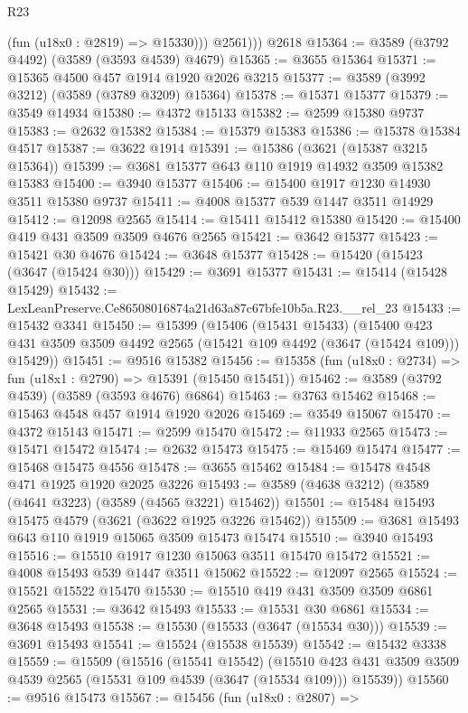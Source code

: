 \begin{lexlean}{R23}
\begin{coremodule}
            (fun (u18x0 : @2819) => @15330)))
          @2561)))
    @2618
@15364 := @3589 (@3792 @4492) (@3589 (@3593 @4539) @4679)
@15365 := @3655 @15364
@15371 := @15365 @4500 @457 @1914 @1920 @2026 @3215
@15377 := @3589 (@3992 @3212) (@3589 (@3789 @3209) @15364)
@15378 := @15371 @15377
@15379 := @3549 @14934
@15380 := @4372 @15133
@15382 := @2599 @15380 @9737
@15383 := @2632 @15382
@15384 := @15379 @15383
@15386 := @15378 @15384 @4517
@15387 := @3622 @1914
@15391 := @15386 (@3621 (@15387 @3215 @15364))
@15399 := @3681 @15377 @643 @110 @1919 @14932 @3509 @15382 @15383
@15400 := @3940 @15377
@15406 := @15400 @1917 @1230 @14930 @3511 @15380 @9737
@15411 := @4008 @15377 @539 @1447 @3511 @14929
@15412 := @12098 @2565
@15414 := @15411 @15412 @15380
@15420 := @15400 @419 @431 @3509 @3509 @4676 @2565
@15421 := @3642 @15377
@15423 := @15421 @30 @4676
@15424 := @3648 @15377
@15428 := @15420 (@15423 (@3647 (@15424 @30)))
@15429 := @3691 @15377
@15431 := @15414 (@15428 @15429)
@15432 := LexLeanPreserve.Ce86508016874a21d63a87c67bfe10b5a.R23.__rel_23
@15433 := @15432 @3341
@15450 := @15399
    (@15406
      (@15431 @15433)
      (@15400 @423 @431 @3509 @3509 @4492 @2565 (@15421 @109 @4492 (@3647 (@15424 @109))) @15429))
@15451 := @9516 @15382
@15456 := @15358 (fun (u18x0 : @2734) => fun (u18x1 : @2790) => @15391 (@15450 @15451))
@15462 := @3589 (@3792 @4539) (@3589 (@3593 @4676) @6864)
@15463 := @3763 @15462
@15468 := @15463 @4548 @457 @1914 @1920 @2026
@15469 := @3549 @15067
@15470 := @4372 @15143
@15471 := @2599 @15470
@15472 := @11933 @2565
@15473 := @15471 @15472
@15474 := @2632 @15473
@15475 := @15469 @15474
@15477 := @15468 @15475 @4556
@15478 := @3655 @15462
@15484 := @15478 @4548 @471 @1925 @1920 @2025 @3226
@15493 := @3589 (@4638 @3212) (@3589 (@4641 @3223) (@3589 (@4565 @3221) @15462))
@15501 := @15484 @15493 @15475 @4579 (@3621 (@3622 @1925 @3226 @15462))
@15509 := @3681 @15493 @643 @110 @1919 @15065 @3509 @15473 @15474
@15510 := @3940 @15493
@15516 := @15510 @1917 @1230 @15063 @3511 @15470 @15472
@15521 := @4008 @15493 @539 @1447 @3511 @15062
@15522 := @12097 @2565
@15524 := @15521 @15522 @15470
@15530 := @15510 @419 @431 @3509 @3509 @6861 @2565
@15531 := @3642 @15493
@15533 := @15531 @30 @6861
@15534 := @3648 @15493
@15538 := @15530 (@15533 (@3647 (@15534 @30)))
@15539 := @3691 @15493
@15541 := @15524 (@15538 @15539)
@15542 := @15432 @3338
@15559 := @15509
    (@15516
      (@15541 @15542)
      (@15510 @423 @431 @3509 @3509 @4539 @2565 (@15531 @109 @4539 (@3647 (@15534 @109))) @15539))
@15560 := @9516 @15473
@15567 := @15456
    (fun (u18x0 : @2807) =>

\end{coremodule}
\end{lexlean}
